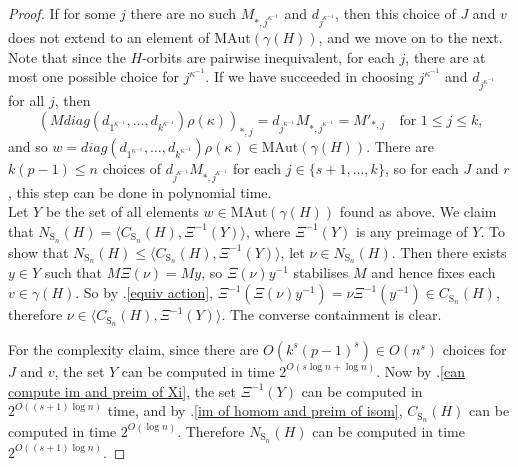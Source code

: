 \documentclass[11pt,a4paper]{article}
\theoremstyle{definition}
\theoremstyle{remark}
\newcommand{\MAut}{\mathrm{MAut}}
\newcommand{\Sy}{\mathrm{S}}
\begin{document}
\begin{proof}
 
If for some $j$ there are no such $M_{*, j^{\kappa^{-1}}}$ and $d_{j^{\kappa^{-1}}}$, then this choice of $J$ and $v$ does not extend to an element of $\MAut(\gamma(H))$, and we move on to the next.
Note that since the $H$-orbits are pairwise inequivalent, for each $j$, there are at most one possible choice for $j^{\kappa^{-1}}$.
If we have succeeded in choosing $j^{\kappa^{-1}}$ and $d_{j^{\kappa^{-1}}}$ for all $j$, then
\[
(M diag(d_{1^{\kappa^{-1}}}, \ldots, d_{k^{\kappa^{-1}}}) \rho(\kappa))_{*,j} = d_{j^{\kappa^{-1}}} M_{*, j^{\kappa^{-1}}}  = M'_{*,j} \quad \text{for $1 \leq j \leq k$,} 
\]
and so $w=diag(d_{1^{\kappa^{-1}}}, \ldots, d_{k^{\kappa^{-1}}}) \rho(\kappa) \in \MAut(\gamma(H))$. 
There are $k(p-1) \leq n$ choices of $d_{j^{\kappa^{-1}}} M_{*, j^{\kappa^{-1}}}$ for each $j \in \{ s+1, \ldots, k \}$, so for each $J$ and $r$, this step can be done in polynomial time. \medskip \\
Let $Y$ be the set of all elements $w \in \MAut(\gamma(H))$ found as above. 
We claim that $N_{\Sy_n}(H) = \langle C_{\Sy_n}(H), \Xi^{-1}(Y) \rangle$, where $\Xi^{-1}(Y)$ is any preimage of $Y$. 
To show that $N_{\Sy_n}(H) \leq \langle C_{\Sy_n}(H), \Xi^{-1}(Y) \rangle$, let $\nu \in N_{\Sy_n}(H)$. Then there exists $y \in Y$ such that $M\Xi(\nu) = My$, so $\Xi(\nu) y^{-1}$ stabilises $M$ and hence fixes each $v \in \gamma(H)$. 
So by .\ref{equiv action}, $\Xi^{-1}(\Xi(\nu)y^{-1}) = \nu \Xi^{-1}(y^{-1}) \in C_{\Sy_n}(H)$, therefore  $\nu \in  \langle C_{\Sy_n}(H), \Xi^{-1}(Y) \rangle$. 
The converse containment is clear. 


For the complexity claim, since there are $O(k^s (p-1)^s ) \in O(n^s)$ choices for $J$ and $v$, 
the set $Y$ can be computed in time $2^{O(s \log{n} + \log{n} )}$. 
Now by .\ref{can compute im and preim of Xi}, the set $\Xi^{-1}(Y)$ can be computed in $2^{O((s+1) \log{n} )}$ time, and by .\ref{im of homom and preim of isom}, $C_{\Sy_n}(H)$ can be computed in time $2^{O(\log{n})}$. Therefore $N_{\Sy_n}(H)$ can be computed in time $2^{O((s+1) \log{n} )}$. 
\end{proof}
\end{document}
